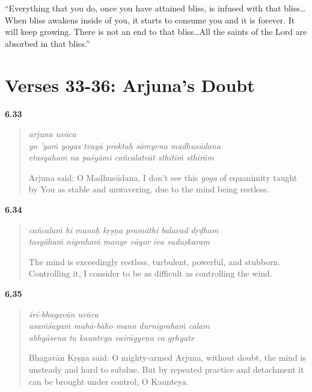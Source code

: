 \enquote{Everything that you do, once you have attained bliss, is infused with that bliss\ldots When bliss awakens inside of you, it starts to consume you and it is forever. It will keep growing. There is not an end to that bliss\ldots All the saints of the Lord are absorbed in that bliss.}

\section{Verses 33-36: Arjuna's Doubt}\label{sec-verses-33-36-arjuna-s-doubt}


\par\noindent\textbf{6.33}\par
\begin{verse}
\textit{arjuna uvāca} \\
\textit{yo ’yaṁ yogas tvayā proktaḥ sāmyena madhusūdana} \\
\textit{etasyāhaṁ na paśyāmi cañcalatvāt sthitiṁ sthirām}

\noindent Arjuna said: O Madhusūdana, I don't see this \textit{yoga} of equanimity taught by You as stable and unwavering, due to the mind being restless.
\end{verse}
\par



\par\noindent\textbf{6.34}\par
\begin{verse}
\textit{cañcalaṁ hi manaḥ kṛṣṇa pramāthi balavad dṛḍham} \\
\textit{tasyāhaṁ nigrahaṁ manye vāyor iva suduṣkaram}

\noindent The mind is exceedingly restless, turbulent, powerful, and stubborn. Controlling it, I consider to be as difficult as controlling the wind.
\end{verse}
\par



\par\noindent\textbf{6.35}\par
\begin{verse}
\textit{śrī-bhagavān uvāca} \\
\textit{asaṁśayaṁ mahā-bāho mano durnigrahaṁ calam} \\
\textit{abhyāsena tu kaunteya vairāgyeṇa ca gṛhyate}

\noindent Bhagavān Kṛṣṇa said: O mighty-armed Arjuna, without doubt, the mind is unsteady and hard to subdue. But by repeated practice and detachment it can be brought under control, O Kaunteya.
\end{verse}
\par



